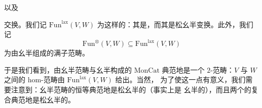 以及
\begin{center}
\end{center}
交换。我们记 $\mathrm{Fun}^{\mathrm{lax}}(V, W)$ 为这样的\trCategory{}：其\trObject{}是\trLaxMonoidalFunctor{}，而其\trMorphism{}是松幺半变换。此外，我们记
\[
\mathrm{Fun}^{\otimes}(V, W) \subseteq \mathrm{Fun}^{\mathrm{lax}}(V, W)
\]
为由幺半\trFunctor{}组成的满子范畴。

\begin{remark}\label{rem:moncat-2-category}
于是我们看到，由幺半范畴与幺半\trFunctor{}构成的\trCategory{} $\mathrm{MonCat}$ 典范地是一个
$2$-范畴：$V$ 与 $W$ 之间的 hom-范畴由 $\mathrm{Fun}^{\mathrm{lax}}(V, W)$ 给出。当然，
为了使这一点有意义，我们需要注意到：幺半范畴的恒等\trFunctor{}典范地是松幺半的（事实上是
幺半的），而且两个\trLaxMonoidalFunctor{}的复合典范地是松幺半的。
\end{remark}

